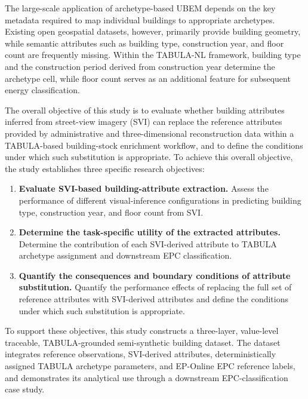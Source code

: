 The large-scale application of archetype-based UBEM depends on the key metadata required to map individual buildings to appropriate archetypes. Existing open geospatial datasets, however, primarily provide building geometry, while semantic attributes such as building type, construction year, and floor count are frequently missing. Within the TABULA-NL framework, building type and the construction period derived from construction year determine the archetype cell, while floor count serves as an additional feature for subsequent energy classification.


The overall objective of this study is to evaluate whether building attributes inferred from street-view imagery (SVI) can replace the reference attributes provided by administrative and three-dimensional reconstruction data within a TABULA-based building-stock enrichment workflow, and to define the conditions under which such substitution is appropriate. To achieve this overall objective, the study establishes three specific research objectives:


\begin{enumerate}
\item \textbf{Evaluate SVI-based building-attribute extraction.} Assess the performance of different visual-inference configurations in predicting building type, construction year, and floor count from SVI.
\item \textbf{Determine the task-specific utility of the extracted attributes.} Determine the contribution of each SVI-derived attribute to TABULA archetype assignment and downstream EPC classification.
\item \textbf{Quantify the consequences and boundary conditions of attribute substitution.} Quantify the performance effects of replacing the full set of reference attributes with SVI-derived attributes and define the conditions under which such substitution is appropriate.
\end{enumerate}


To support these objectives, this study constructs a three-layer, value-level traceable, TABULA-grounded semi-synthetic building dataset. The dataset integrates reference observations, SVI-derived attributes, deterministically assigned TABULA archetype parameters, and EP-Online EPC reference labels, and demonstrates its analytical use through a downstream EPC-classification case study.
